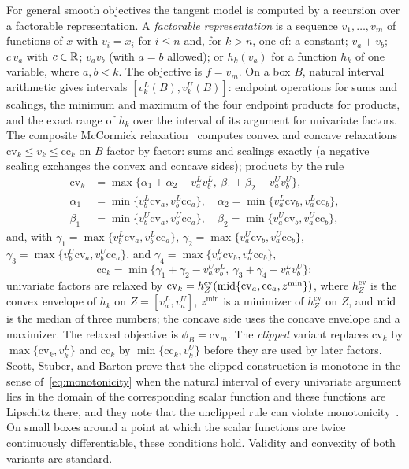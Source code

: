For general smooth objectives the tangent model is computed by a recursion
over a factorable representation. A \emph{factorable representation} is a
sequence $v_1,\dots,v_m$ of functions of $x$ with $v_i=x_i$ for $i\le n$
and, for $k>n$, one of: a constant; $v_a+v_b$; $c\,v_a$ with $c\in\mathbb{R}$;
$v_av_b$ (with $a=b$ allowed); or $h_k(v_a)$ for a function $h_k$ of one
variable, where $a,b<k$. The objective is $f=v_m$. On a box $B$, natural
interval arithmetic gives intervals $[v_k^L(B),v_k^U(B)]$: endpoint
operations for sums and scalings, the minimum and maximum of the four
endpoint products for products, and the exact range of $h_k$ over the
interval of its argument for univariate factors. The composite McCormick
relaxation~\cite{mccormick1976-computability-of-global-solutions-to,mitsos2009-mccormick-based-relaxations-of-algorithms}
computes convex and concave relaxations $\mathrm{cv}_k\le v_k\le\mathrm{cc}_k$
on $B$ factor by factor: sums and scalings exactly (a negative scaling
exchanges the convex and concave sides); products by the rule
\begin{align*}
  \mathrm{cv}_k&=\max\bigl\{\alpha_1+\alpha_2-v_a^Lv_b^L,\ \beta_1+\beta_2-v_a^Uv_b^U\bigr\},\\
  \alpha_1&=\min\{v_b^L\mathrm{cv}_a,v_b^L\mathrm{cc}_a\},\quad
  \alpha_2=\min\{v_a^L\mathrm{cv}_b,v_a^L\mathrm{cc}_b\},\\
  \beta_1&=\min\{v_b^U\mathrm{cv}_a,v_b^U\mathrm{cc}_a\},\quad
  \beta_2=\min\{v_a^U\mathrm{cv}_b,v_a^U\mathrm{cc}_b\},
\end{align*}
and, with $\gamma_1=\max\{v_b^L\mathrm{cv}_a,v_b^L\mathrm{cc}_a\}$,
$\gamma_2=\max\{v_a^U\mathrm{cv}_b,v_a^U\mathrm{cc}_b\}$,
$\gamma_3=\max\{v_b^U\mathrm{cv}_a,v_b^U\mathrm{cc}_a\}$, and
$\gamma_4=\max\{v_a^L\mathrm{cv}_b,v_a^L\mathrm{cc}_b\}$,
\[
  \mathrm{cc}_k=\min\bigl\{\gamma_1+\gamma_2-v_a^Uv_b^L,\ \gamma_3+\gamma_4-v_a^Lv_b^U\bigr\};
\]
univariate factors are relaxed by
$\mathrm{cv}_k=h^{\mathrm{cv}}_Z(\operatorname{mid}\{\mathrm{cv}_a,\mathrm{cc}_a,z^{\min}\})$,
where $h^{\mathrm{cv}}_Z$ is the convex envelope of $h_k$ on
$Z=[v_a^L,v_a^U]$, $z^{\min}$ is a minimizer of $h^{\mathrm{cv}}_Z$ on $Z$, and
$\operatorname{mid}$ is the median of three numbers; the concave side uses the concave
envelope and a maximizer. The relaxed objective is
$\phi_B=\mathrm{cv}_m$. The \emph{clipped} variant replaces $\mathrm{cv}_k$ by
$\max\{\mathrm{cv}_k,v_k^L\}$ and $\mathrm{cc}_k$ by $\min\{\mathrm{cc}_k,v_k^U\}$
before they are used by later factors. Scott, Stuber, and Barton prove that
the clipped construction is monotone in the sense of~\eqref{eq:monotonicity}
when the natural interval of every univariate argument lies in the domain
of the corresponding scalar function and these functions are Lipschitz
there, and they note that the unclipped rule can violate
monotonicity~\cite{scott2011-generalized-mccormick-relaxations}. On small
boxes around a point at which the scalar functions are twice continuously
differentiable, these conditions hold. Validity and convexity of both
variants are standard.


